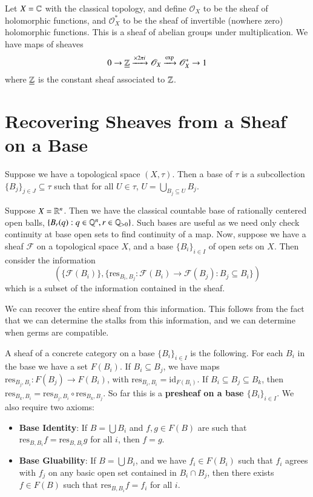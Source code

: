 \begin{example}
    Let $X = \mathbb C$ with the classical topology, and define $\mathscr{O}_X$ to be the sheaf of holomorphic functions, and $\mathscr{O}_X^*$ to be the sheaf of invertible (nowhere zero) holomorphic functions. This is a sheaf of abelian groups under multiplication. We have maps of sheaves $$0\rightarrow \underline{\mathbb Z}\xrightarrow{\times 2\pi i}\mathscr{O}_X\xrightarrow{\text{exp}}\mathscr{O}_X^*\rightarrow 1$$
    where $\underline{\mathbb Z}$ is the constant sheaf associated to $\mathbb Z$.
\end{example}


\section{Recovering Sheaves from a Sheaf on a Base}

\begin{definition}
    Suppose we have a topological space $(X,\tau)$. Then a base of $\tau$ is a subcollection $\{B_j\}_{j \in J} \subseteq \tau$ such that for all $U \in \tau$, $U = \bigcup_{B_j \subseteq U}B_j$.
\end{definition}

Suppose $X = \mathbb R^n$. Then we have the classical countable base of rationally centered open balls, $\{B_r(q):q \in \mathbb Q^n, r \in \mathbb Q_{> 0}\}$. Such bases are useful as we need only check continuity at base open sets to find continuity of a map. Now, suppose we have a sheaf $\mathscr{F}$ on a topological space $X$, and a base $\{B_i\}_{i \in I}$ of open sets on $X$. Then consider the information $$(\{\mathscr{F}(B_i)\},\{\text{res}_{B_i,B_j}:\mathscr{F}(B_i)\rightarrow \mathscr{F}(B_j):B_j \subseteq B_i\})$$
which is a subset of the information contained in the sheaf.

We can recover the entire sheaf from this information. This follows from the fact that we can determine the stalks from this information, and we can determine when germs are compatible.

\begin{definition}
    A sheaf of a concrete category on a base $\{B_i\}_{i \in I}$ is the following. For each $B_i$ in the base we have a set $F(B_i)$. If $B_i \subseteq B_j$, we have maps $\text{res}_{B_j,B_i}:F(B_j)\rightarrow F(B_i)$, with $\text{res}_{B_i,B_i} = \text{id}_{F(B_i)}$. If $B_i \subseteq B_j \subseteq B_k$, then $\text{res}_{B_k,B_i} = \text{res}_{B_j,B_i}\circ \text{res}_{B_k,B_j}$. So far this is a \textbf{presheaf on a base $\{B_i\}_{i \in I}$}. We also require two axioms: \begin{itemize}
        \item \textbf{Base Identity}: If $B = \bigcup B_i$ and $f,g \in F(B)$ are such that $\text{res}_{B,B_i}f = \text{res}_{B,B_i}g$ for all $i$, then $f = g$.
        \item \textbf{Base Gluability}: If $B = \bigcup B_i$, and we have $f_i \in F(B_i)$ such that $f_i$ agrees with $f_j$ on any basic open set contained in $B_i \cap B_j$, then there exists $f \in F(B)$ such that $\text{res}_{B,B_i}f = f_i$ for all $i$.
    \end{itemize}
\end{definition}


